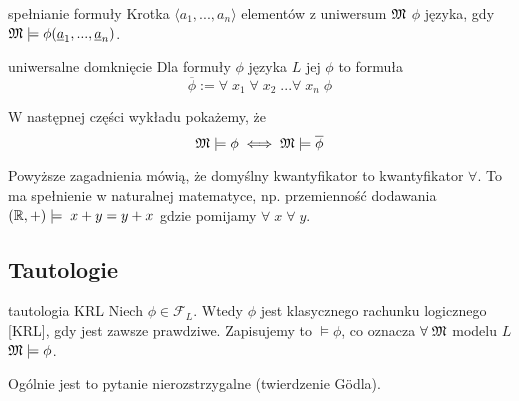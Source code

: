 


\begin{definition}{spełnianie formuły}{}
  Krotka $\langle a_1,...,a_n\rangle$ elementów z uniwersum $\mathfrak{M}$  $\phi$ języka, gdy $\mathfrak{M}\models\phi(\underline{a}_1,...,\underline{a}_n)$.
\end{definition}

\begin{definition}{uniwersalne domknięcie}{}
  Dla formuły $\phi$ języka $L$ jej  $\phi$ to formuła
  $$\overline{\phi}:=\forall\;x_1\;\forall\;x_2\;...\forall\;x_n\;\phi$$
\end{definition}
W następnej części wykładu pokażemy, że 
$$\mathfrak{M}\models\phi\iff\mathfrak{M}\models\overline{\phi}$$

Powyższe zagadnienia mówią, że domyślny kwantyfikator to kwantyfikator $\forall$. To ma spełnienie w naturalnej matematyce, np. przemienność dodawania $(\mathbb{R}, +)\models\;x+y=y+x$ gdzie pomijamy $\forall\;x\;\forall\;y$.

\subsection{Tautologie}

\begin{definition}{tautologia KRL}{}
  Niech $\phi\in\mathcal{F}_L$. Wtedy $\phi$ jest  klasycznego rachunku logicznego [KRL], gdy jest zawsze prawdziwe. Zapisujemy to $\models\phi$, co oznacza $\forall\;\mathfrak{M}$ modelu $L$ $\mathfrak{M}\models\phi$.
\end{definition}

 Ogólnie jest to pytanie nierozstrzygalne (twierdzenie G\"odla).

